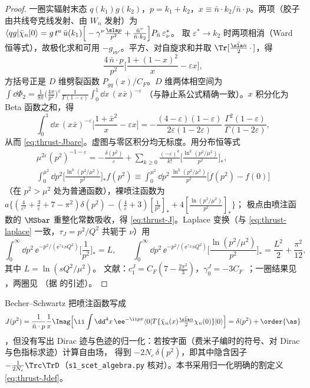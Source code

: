 \begin{proof}
一圈实辐射末态 $q(k_1)g(k_2)$，$p=k_1+k_2$，$x\equiv\bar n\cdot k_2/\bar n\cdot p$。两项（胶子由共线夸克线发射、由 $W_n$ 发射）为
$\langle qg|\bar\chi_n|0\rangle=g\,t^a\,\bar u(k_1)\Big[-\gamma^\nu\frac{\sla p}{p^2}+\frac{\bar n^\nu}{\bar n\cdot k_2}\Big]P_{\bar n}\,\varepsilon^*_\nu$。
取 $\varepsilon^*\to k_2$ 时两项相消（Ward 恒等式），故极化求和可用 $-g_{\nu\nu'}$。平方、对自旋求和并取 $\Tr[\frac{\nbslash}{2}\,\cdot\,]$，得
\[
\frac{4\,\bar n\cdot p}{p^2}\Big[\frac{1+(1-x)^2}{x}-\varepsilon x\Big],
\]
方括号正是 $D$ 维劈裂函数 $P_{gq}(x)/C_F$。$D$ 维两体相空间为
$\int\dd\Phi_2=\frac{1}{8\pi}\big(\frac{4\pi}{p^2}\big)^{\varepsilon}\frac{1}{\Gamma(1-\varepsilon)}\int_0^1\dd x\,(x\bar x)^{-\varepsilon}$
（与静止系公式精确一致）。$x$ 积分化为 Beta 函数之和，得
\[
\int_0^1\dd x\,(x\bar x)^{-\varepsilon}\Big[\frac{1+\bar x^2}{x}-\varepsilon x\Big]=-\frac{(4-\varepsilon)(1-\varepsilon)}{2\varepsilon(1-2\varepsilon)}\,\frac{\Gamma^2(1-\varepsilon)}{\Gamma(1-2\varepsilon)},
\]
从而 \cref{eq:thrust-Jbare}。虚图与零区积分均无标度。用分布恒等式
\begin{equation}\label{eq:thrust-distid}
\begin{gathered}
\mu^{2\varepsilon}(p^2)^{-1-\varepsilon}=-\frac{\delta(p^2)}{\varepsilon}+\sum_{k\geq0}\frac{(-\varepsilon)^k}{k!}\Big[\frac{\ln^k(p^2/\mu^2)}{p^2}\Big]_*,\\
\int_0^{\mu^2}\!\dd p^2\Big[\frac{\ln^k(p^2/\mu^2)}{p^2}\Big]_*f(p^2)\equiv\int_0^{\mu^2}\!\dd p^2\,\frac{\ln^k(p^2/\mu^2)}{p^2}\big[f(p^2)-f(0)\big]
\end{gathered}
\end{equation}
（在 $p^2>\mu^2$ 处为普通函数），裸喷注函数为
$a\big\{(\frac{4}{\varepsilon^2}+\frac{3}{\varepsilon}+7-\pi^2)\delta(p^2)-(\frac4\varepsilon+3)[\frac1{p^2}]_*+4[\frac{\ln(p^2/\mu^2)}{p^2}]_*\big\}$；
极点由喷注函数的 $\MSbar$ 重整化常数吸收，得 \cref{eq:thrust-J}。Laplace 变换（与 \cref{eq:thrust-laplace} 一致，$\tau_J=p^2/Q^2$ 共轭于 $\nu$）用
\[
\int_0^\infty\!\dd p^2\,\ee^{-p^2/(\ee^{\gamma_E}sQ^2)}\Big[\frac{1}{p^2}\Big]_*=L,\qquad
\int_0^\infty\!\dd p^2\,\ee^{-p^2/(\ee^{\gamma_E}sQ^2)}\Big[\frac{\ln(p^2/\mu^2)}{p^2}\Big]_*=\frac{L^2}{2}+\frac{\pi^2}{12},
\]
其中 $L=\ln(sQ^2/\mu^2)$。
文献：$c_1^J=C_F(7-\frac{2\pi^2}{3})$，$\gamma^J_0=-3C_F$~\cite{BecherSchwartz2008}；一圈结果见 \cite{BauerManohar2004}，两圈见 \cite{BecherNeubert2006}（据 \cite{BecherSchwartz2008} 的引述）。
\end{proof}

\begin{remark}[喷注函数定义的归一化]\label{rem:thrust-Jnorm}
Becher--Schwartz 把喷注函数写成
\[
J(p^2)=\frac{1}{\bar n\cdot p}\frac1\pi\Imag\Big[\ii\int\dd^4x\,\ee^{-\ii px}\langle0|T\{\bar\chi_n(x)\tfrac{\nbslash}{2}\chi_n(0)\}|0\rangle\Big]=\delta(p^2)+\order{\as}
\]
\cite{BecherSchwartz2008}，但没有写出 Dirac 迹与色迹的归一化：若按字面（费米子编时的符号、对 Dirac 与色指标求迹）计算自由场，
得到 $-2N_c\,\delta(p^2)$，即其中隐含因子 $-\frac{1}{2N_c}\Trc\TrD$（\texttt{s1\_\allowbreak scet\_\allowbreak algebra.py} 核对）。本书采用归一化明确的割定义 \cref{eq:thrust-Jdef}。
\end{remark}

